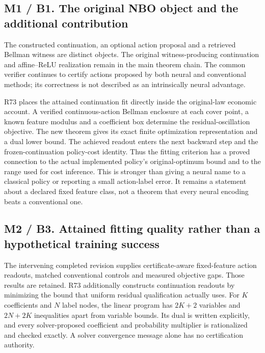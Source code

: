 \hypertarget{m1-b1.-the-original-nbo-object-and-the-additional-contribution}{%
\subsection{M1 / B1. The original NBO object and the additional
contribution}\label{m1-b1.-the-original-nbo-object-and-the-additional-contribution}}

The constructed continuation, an optional action proposal and a
retrieved Bellman witness are distinct objects. The original
witness-producing continuation and affine--ReLU realization remain in
the main theorem chain. The common verifier continues to certify actions
proposed by both neural and conventional methods; its correctness is not
described as an intrinsically neural advantage.

R73 places the attained continuation fit directly inside the
original-law economic account. A verified continuous-action Bellman
enclosure at each cover point, a known feature modulus and a coefficient
box determine the residual-oscillation objective. The new theorem gives
its exact finite optimization representation and a dual lower bound. The
achieved readout enters the next backward step and the
frozen-continuation policy-cost identity. Thus the fitting criterion has
a proved connection to the actual implemented policy's original-optimum
bound and to the range used for cost inference. This is stronger than
giving a neural name to a classical policy or reporting a small
action-label error. It remains a statement about a declared fixed
feature class, not a theorem that every neural encoding beats a
conventional one.

\hypertarget{m2-b3.-attained-fitting-quality-rather-than-a-hypothetical-training-success}{%
\subsection{M2 / B3. Attained fitting quality rather than a hypothetical
training
success}\label{m2-b3.-attained-fitting-quality-rather-than-a-hypothetical-training-success}}

The intervening completed revision supplies certificate-aware
fixed-feature action readouts, matched conventional controls and
measured objective gaps. Those results are retained. R73 additionally
constructs continuation readouts by minimizing the bound that uniform
residual qualification actually uses. For \(K\) coefficients and \(N\)
label nodes, the linear program has \(2K+2\) variables and \(2N+2K\)
inequalities apart from variable bounds. Its dual is written explicitly,
and every solver-proposed coefficient and probability multiplier is
rationalized and checked exactly. A solver convergence message alone has
no certification authority.

